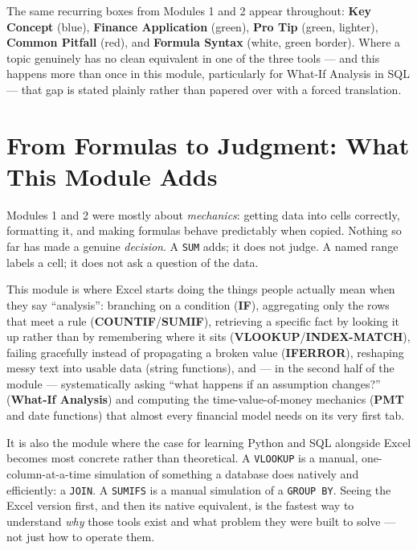 \documentclass[11pt,a4paper]{article}
\begin{document}
The same recurring boxes from Modules 1 and 2 appear throughout: \textbf{Key Concept} (blue), \textbf{Finance Application} (green), \textbf{Pro Tip} (green, lighter), \textbf{Common Pitfall} (red), and \textbf{Formula Syntax} (white, green border). Where a topic genuinely has no clean equivalent in one of the three tools --- and this happens more than once in this module, particularly for What-If Analysis in SQL --- that gap is stated plainly rather than papered over with a forced translation.

\section{From Formulas to Judgment: What This Module Adds}

Modules 1 and 2 were mostly about \emph{mechanics}: getting data into cells correctly, formatting it, and making formulas behave predictably when copied. Nothing so far has made a genuine \emph{decision}. A \texttt{SUM} adds; it does not judge. A named range labels a cell; it does not ask a question of the data.

\begin{keyconcept}
This module is where Excel starts doing the things people actually mean when they say ``analysis'': branching on a condition (\textbf{IF}), aggregating only the rows that meet a rule (\textbf{COUNTIF}/\textbf{SUMIF}), retrieving a specific fact by looking it up rather than by remembering where it sits (\textbf{VLOOKUP}/\textbf{INDEX-MATCH}), failing gracefully instead of propagating a broken value (\textbf{IFERROR}), reshaping messy text into usable data (string functions), and --- in the second half of the module --- systematically asking ``what happens if an assumption changes?'' (\textbf{What-If Analysis}) and computing the time-value-of-money mechanics (\textbf{PMT} and date functions) that almost every financial model needs on its very first tab.
\end{keyconcept}

It is also the module where the case for learning Python and SQL alongside Excel becomes most concrete rather than theoretical. A \texttt{VLOOKUP} is a manual, one-column-at-a-time simulation of something a database does natively and efficiently: a \texttt{JOIN}. A \texttt{SUMIFS} is a manual simulation of a \texttt{GROUP BY}. Seeing the Excel version first, and then its native equivalent, is the fastest way to understand \emph{why} those tools exist and what problem they were built to solve --- not just how to operate them.
\end{document}
